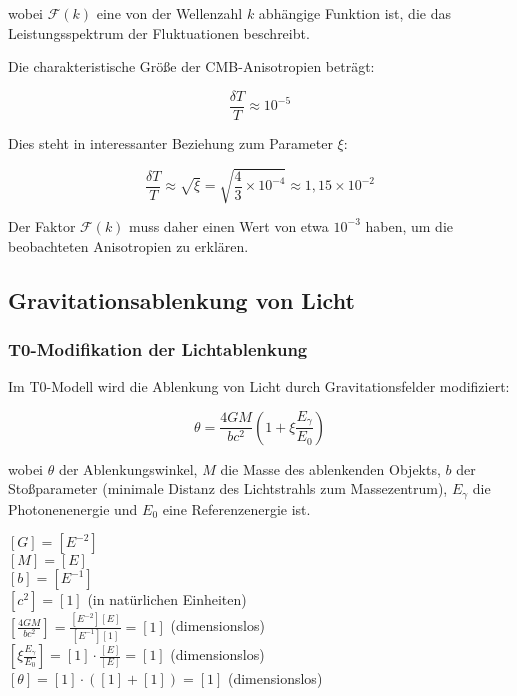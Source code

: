 \documentclass[12pt,a4paper]{article}
\theoremstyle{definition}
\begin{document}
wobei $\mathcal{F}(k)$ eine von der Wellenzahl $k$ abhängige Funktion ist, die das Leistungsspektrum der Fluktuationen beschreibt.

Die charakteristische Größe der CMB-Anisotropien beträgt:

\begin{equation}
	\frac{\delta T}{T} \approx 10^{-5}
\end{equation}

Dies steht in interessanter Beziehung zum Parameter $\xi$:

\begin{equation}
	\frac{\delta T}{T} \approx \sqrt{\xi} = \sqrt{\frac{4}{3} \times 10^{-4}} \approx 1,15 \times 10^{-2}
\end{equation}

Der Faktor $\mathcal{F}(k)$ muss daher einen Wert von etwa $10^{-3}$ haben, um die beobachteten Anisotropien zu erklären.

\subsection{Gravitationsablenkung von Licht}

\subsubsection{T0-Modifikation der Lichtablenkung}

Im T0-Modell wird die Ablenkung von Licht durch Gravitationsfelder modifiziert:

\begin{equation}
	\boxed{\theta = \frac{4GM}{bc^2}\left(1 + \xi \frac{E_\gamma}{E_0}\right)}
\end{equation}

wobei $\theta$ der Ablenkungswinkel, $M$ die Masse des ablenkenden Objekts, $b$ der Stoßparameter (minimale Distanz des Lichtstrahls zum Massezentrum), $E_\gamma$ die Photonenenergie und $E_0$ eine Referenzenergie ist.

\begin{einheitencheck}
	$[G] = [E^{-2}]$\\
	$[M] = [E]$\\
	$[b] = [E^{-1}]$\\
	$[c^2] = [1]$ (in natürlichen Einheiten)\\
	$[\frac{4GM}{bc^2}] = \frac{[E^{-2}][E]}{[E^{-1}][1]} = [1]$ (dimensionslos)\\
	$[\xi \frac{E_\gamma}{E_0}] = [1] \cdot \frac{[E]}{[E]} = [1]$ (dimensionslos)\\
	$[\theta] = [1] \cdot ([1] + [1]) = [1]$ (dimensionslos) \checkmark
\end{einheitencheck}
\end{document}
